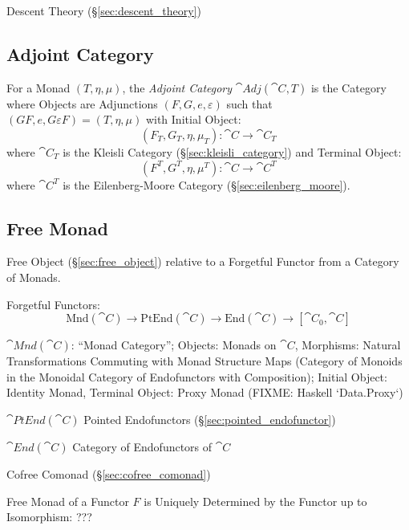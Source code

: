 Descent Theory (\S\ref{sec:descent_theory})



\subsection{Adjoint Category}\label{sec:adjoint_category}

For a Monad $(T,\eta,\mu)$, the \emph{Adjoint Category}
$\cat{Adj}(\cat{C}, T)$ is the Category where Objects are
Adjunctions $(F,G,e,\varepsilon)$ such that $(GF,e,G \varepsilon F) =
(T,\eta,\mu)$ with Initial Object:
\[
  (F_T, G_T, \eta, \mu_T) : \cat{C} \rightarrow \cat{C}_T
\]
where $\cat{C}_T$ is the Kleisli Category
(\S\ref{sec:kleisli_category}) and Terminal Object:
\[
  (F^T, G^T, \eta, \mu^T) : \cat{C} \rightarrow \cat{C}^T
\]
where $\cat{C}^T$ is the Eilenberg-Moore Category
(\S\ref{sec:eilenberg_moore}).



\subsection{Free Monad}\label{sec:free_monad}

Free Object (\S\ref{sec:free_object}) relative to a Forgetful Functor
from a Category of Monads.

Forgetful Functors:
\[
  \mathrm{Mnd}(\cat{C}) \rightarrow \mathrm{PtEnd}(\cat{C})
  \rightarrow \mathrm{End}(\cat{C}) \rightarrow [\cat{C}_0, \cat{C}]
\]

$\cat{Mnd}(\cat{C})$: ``Monad Category''; Objects: Monads on
$\cat{C}$, Morphisms: Natural Transformations Commuting with Monad
Structure Maps (Category of Monoids in the Monoidal Category of
Endofunctors with Composition); Initial Object: Identity Monad,
Terminal Object: Proxy Monad (FIXME: Haskell `Data.Proxy`)

$\cat{PtEnd}(\cat{C})$ Pointed Endofunctors
(\S\ref{sec:pointed_endofunctor})

$\cat{End}(\cat{C})$ Category of Endofunctors of $\cat{C}$

Cofree Comonad (\S\ref{sec:cofree_comonad})

Free Monad of a Functor $F$ is Uniquely Determined by the Functor up
to Isomorphism: ??? %



